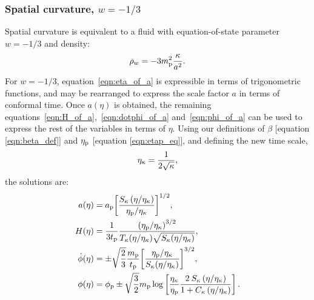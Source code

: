 \subsubsection{Spatial curvature, $w=-1/3$}
Spatial curvature is equivalent to a fluid with equation-of-state parameter $w=-1/3$ and density:
%
\begin{equation}
  \rho_w = -3m_{\mathrm{p}}^2\frac{\kappa}{a^{2}}.
\end{equation}
%
For $w=-1/3$, equation~\eqref{eqn:eta_of_a} is expressible in terms of trigonometric functions, and may be rearranged to express the scale factor $a$ in terms of conformal time. Once $a(\eta)$ is obtained, the remaining equations~\eqref{eqn:H_of_a},~\eqref{eqn:dotphi_of_a} and~\eqref{eqn:phi_of_a} can be used to express the rest of the variables in terms of $\eta$. Using our definitions of $\beta$ [equation \nolinebreak\ref{eqn:beta_def}] and $\eta_{\mathrm{p}}$ [equation \nolinebreak\ref{eqn:etap_eq}], and defining the new time scale,
%
\begin{equation}
  \eta_\mathrm{\kappa} = \frac{1}{2\sqrt{\kappa}},
  \label{eqn:etak}
\end{equation}
%
the solutions are:
%
\begin{align}
  a(\eta)
  &=
  a_{\mathrm{p}}{\left[
  \frac
  {S_\kappa\left(\eta/\eta_\mathrm{\kappa}\right)}
  {\eta_{\mathrm{p}}/\eta_\mathrm{\kappa}} \right]}^{1/2},
  \\
  H(\eta)
  &=
  \frac{1}{3t_{\mathrm{p}}}
  \frac{{(\eta_{\mathrm{p}}/\eta_\mathrm{\kappa})}^{3/2}}
  {T_\kappa(\eta/\eta_\mathrm{\kappa})\sqrt{S_\kappa(\eta/\eta_\mathrm{\kappa})}}, 
  \\
  \dot{\phi}(\eta)
  &=
  \pm\sqrt{\frac{2}{3}}
  \frac{m_{\mathrm{p}}}{t_{\mathrm{p}}}
  {\left[
  \frac
  {\eta_{\mathrm{p}}/\eta_\mathrm{\kappa}}
  {S_{\kappa}(\eta/\eta_\mathrm{\kappa})}
  \right]}^{3/2},
  \\
  \phi(\eta) 
  &=
  \phi_{\mathrm{p}} \pm \sqrt{\frac{3}{2}}m_{\mathrm{p}}\log  \left[
  \frac{\eta_\mathrm{\kappa}}{\eta_{\mathrm{p}}} 
  \frac{2\:S_{\kappa}\left(\eta/\eta_\mathrm{\kappa} \right) }
  {1 + C_{\kappa} \left( \eta/\eta_\mathrm{\kappa} \right)   }  
  \right]. 
\end{align}
%



